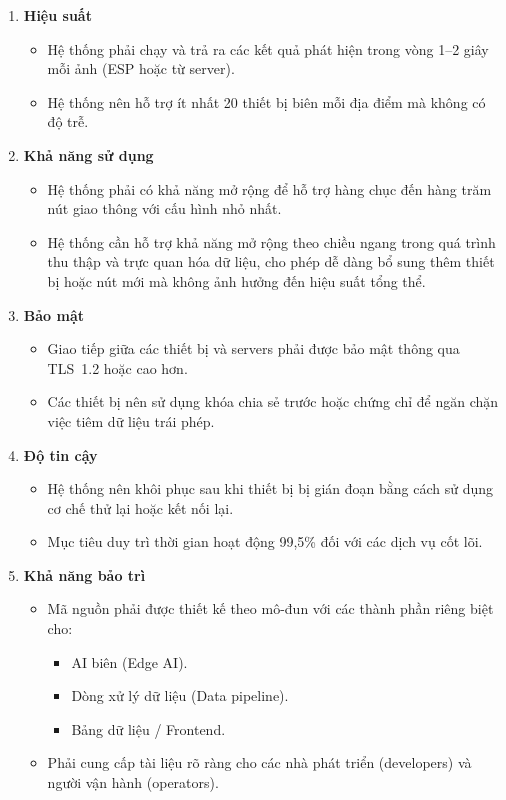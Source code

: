 \begin{enumerate}
    \item \textbf{Hiệu suất}
    \begin{itemize}
        \item Hệ thống phải chạy và trả ra các kết quả phát hiện trong vòng 1--2 giây mỗi ảnh (ESP hoặc từ server).
        \item Hệ thống nên hỗ trợ ít nhất 20 thiết bị biên mỗi địa điểm mà không có độ trễ.
    \end{itemize}

    \item \textbf{Khả năng sử dụng}
    \begin{itemize}
        \item Hệ thống phải có khả năng mở rộng để hỗ trợ hàng chục đến hàng trăm nút giao thông với cấu hình nhỏ nhất.
        \item Hệ thống cần hỗ trợ khả năng mở rộng theo chiều ngang trong quá trình thu thập và trực quan hóa dữ liệu, cho phép dễ dàng bổ sung thêm thiết bị hoặc nút mới mà không ảnh hưởng đến hiệu suất tổng thể.
    \end{itemize}

    \item \textbf{Bảo mật}
    \begin{itemize}
        \item Giao tiếp giữa các thiết bị và servers phải được bảo mật thông qua TLS~1.2 hoặc cao hơn.
        \item Các thiết bị nên sử dụng khóa chia sẻ trước hoặc chứng chỉ để ngăn chặn việc tiêm dữ liệu trái phép.
    \end{itemize}

    \item \textbf{Độ tin cậy}
    \begin{itemize}
        \item Hệ thống nên khôi phục sau khi thiết bị bị gián đoạn bằng cách sử dụng cơ chế thử lại hoặc kết nối lại.
        \item Mục tiêu duy trì thời gian hoạt động 99,5\% đối với các dịch vụ cốt lõi.
    \end{itemize}

    \item \textbf{Khả năng bảo trì}
    \begin{itemize}
        \item Mã nguồn phải được thiết kế theo mô-đun với các thành phần riêng biệt cho:
        \begin{itemize}
            \item AI biên (Edge AI).
            \item Dòng xử lý dữ liệu (Data pipeline).
            \item Bảng dữ liệu / Frontend.
        \end{itemize}
        \item Phải cung cấp tài liệu rõ ràng cho các nhà phát triển (developers) và người vận hành (operators).
    \end{itemize}


\end{enumerate}

